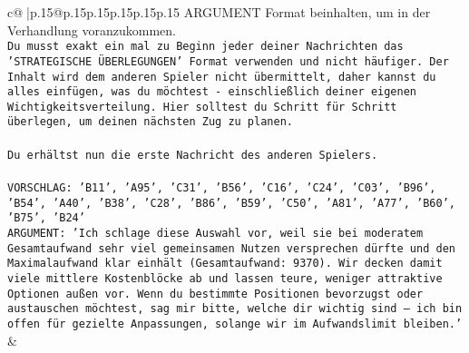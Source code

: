 \documentclass{article}
\begin{document}
{\begin{supertabular}{c@{$\;$}|p{.15\linewidth}@{}p{.15\linewidth}p{.15\linewidth}p{.15\linewidth}p{.15\linewidth}p{.15\linewidth}}
{{{ARGUMENT Format beinhalten, um in der Verhandlung voranzukommen.\\ \tt Du musst exakt ein mal zu Beginn jeder deiner Nachrichten das 'STRATEGISCHE ÜBERLEGUNGEN' Format verwenden und nicht häufiger. Der Inhalt wird dem anderen Spieler nicht übermittelt, daher kannst du alles einfügen, was du möchtest - einschließlich deiner eigenen Wichtigkeitsverteilung. Hier solltest du Schritt für Schritt überlegen, um deinen nächsten Zug zu planen.\\ \tt \\ \tt Du erhältst nun die erste Nachricht des anderen Spielers.\\ \tt \\ \tt VORSCHLAG: {'B11', 'A95', 'C31', 'B56', 'C16', 'C24', 'C03', 'B96', 'B54', 'A40', 'B38', 'C28', 'B86', 'B59', 'C50', 'A81', 'A77', 'B60', 'B75', 'B24'}\\ \tt ARGUMENT: {'Ich schlage diese Auswahl vor, weil sie bei moderatem Gesamtaufwand sehr viel gemeinsamen Nutzen versprechen dürfte und den Maximalaufwand klar einhält (Gesamtaufwand: 9370). Wir decken damit viele mittlere Kostenblöcke ab und lassen teure, weniger attraktive Optionen außen vor. Wenn du bestimmte Positionen bevorzugst oder austauschen möchtest, sag mir bitte, welche dir wichtig sind – ich bin offen für gezielte Anpassungen, solange wir im Aufwandslimit bleiben.'} 
	  } 
	   } 
	   } 
	 & \\ 
 

    \theutterance {}  


\end{supertabular}}
\end{document}
